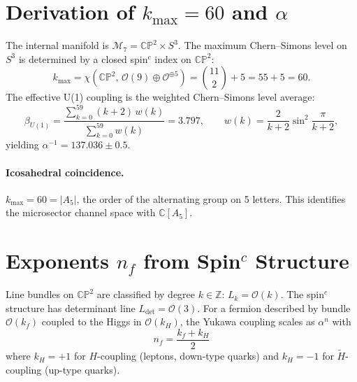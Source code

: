\documentclass[11pt,a4paper]{article}
\newcommand{\CP}{\mathbb{CP}}
\newcommand{\Z}{\mathbb{Z}}
\theoremstyle{definition}
\theoremstyle{remark}
\begin{document}
\section{Derivation of $k_{\max} = 60$ and $\alpha$}
\label{sec:alpha}

The internal manifold is $\mathcal{M}_7 = \CP^2 \times S^3$.  The maximum
Chern--Simons level on $S^3$ is determined by a closed spin$^c$ index
on $\CP^2$:
\begin{equation}
k_{\max} = \chi(\CP^2,\,\mathcal{O}(9) \oplus \mathcal{O}^{\oplus 5})
= \binom{11}{2} + 5 = 55 + 5 = 60.
\end{equation}
The effective U(1) coupling is the weighted Chern--Simons level average:
\begin{equation}
\beta_{U(1)} = \frac{\sum_{k=0}^{59}(k+2)\,w(k)}{\sum_{k=0}^{59}w(k)}
= 3.797,
\qquad
w(k) = \frac{2}{k+2}\sin^2\!\frac{\pi}{k+2},
\end{equation}
yielding $\alpha^{-1} = 137.036 \pm 0.5$.

\paragraph{Icosahedral coincidence.}
$k_{\max} = 60 = |A_5|$, the order of the alternating group on 5 letters.
This identifies the microsector channel space with $\mathbb{C}[A_5]$.

\section{Exponents $n_f$ from Spin$^c$ Structure}
\label{sec:exponents}

Line bundles on $\CP^2$ are classified by degree $k \in \Z$:
$L_k = \mathcal{O}(k)$.  The spin$^c$ structure has determinant line
$L_{\det} = \mathcal{O}(3)$.  For a fermion described by bundle $\mathcal{O}(k_f)$
coupled to the Higgs in $\mathcal{O}(k_H)$, the Yukawa coupling scales as
$\alpha^n$ with
\begin{equation}\label{eq:exponent}
\boxed{n_f = \frac{k_f + k_H}{2}}
\end{equation}
where $k_H = +1$ for $H$-coupling (leptons, down-type quarks) and
$k_H = -1$ for $\tilde{H}$-coupling (up-type quarks).
\end{document}

